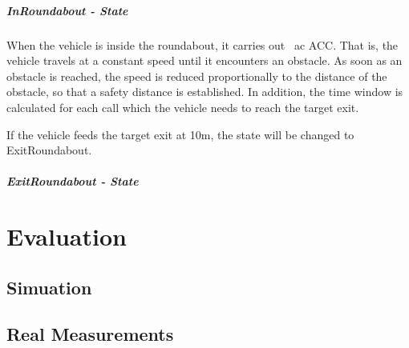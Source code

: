 \documentclass[11pt,oneside,openright]{mpreport}
\begin{document}
\paragraph{InRoundabout - State}
When the vehicle is inside the roundabout, it carries out \ ac {ACC}. That is, the vehicle travels at a constant speed until it encounters an obstacle. 
As soon as an obstacle is reached, the speed is reduced proportionally to the distance of the obstacle, so that a safety distance is established.
In addition, the time window is calculated for each call which the vehicle needs to reach the target exit. 


If the vehicle feeds the target exit at 10m, the state will be changed to ExitRoundabout. 

\paragraph{ExitRoundabout - State}



\chapter{Evaluation}



\section{Simuation}
\section{Real Measurements}
\end{document}
